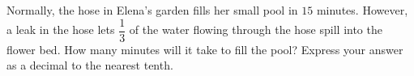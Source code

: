 Normally, the hose in Elena's garden fills her small pool in $15$ minutes. However, a leak in the hose lets $\dfrac{1}{3}$ of the water flowing through the hose spill into the flower bed. How many minutes will it take to fill the pool? Express your answer as a decimal to the nearest tenth.
